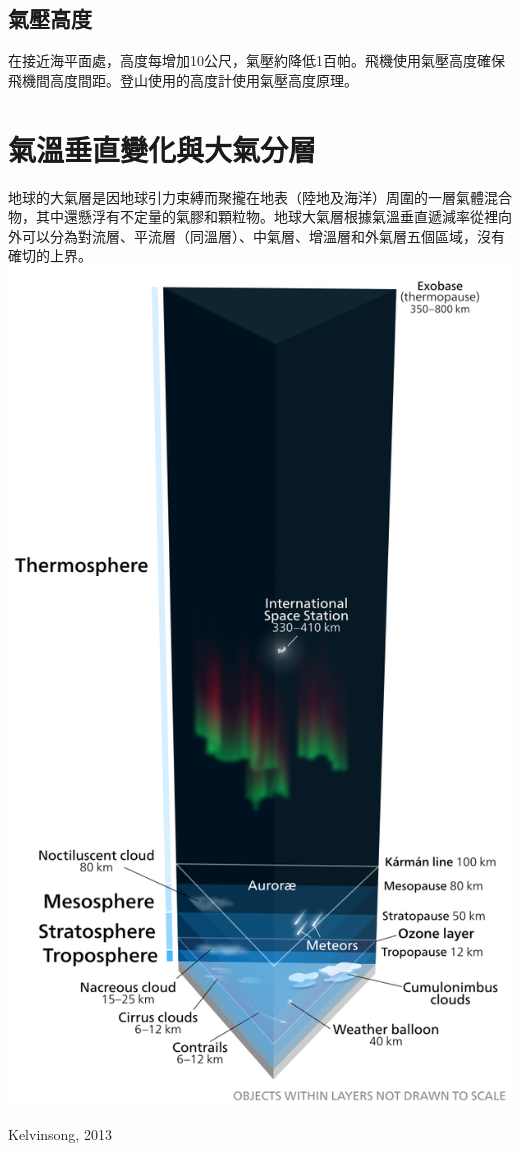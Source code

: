 \documentclass[a4paper,12pt]{report}
\begin{document}
\subsection{氣壓高度}
在接近海平面處，高度每增加10公尺，氣壓約降低1百帕。飛機使用氣壓高度確保飛機間高度間距。登山使用的高度計使用氣壓高度原理。
\section{氣溫垂直變化與大氣分層}
地球的大氣層是因地球引力束縛而聚攏在地表（陸地及海洋）周圍的一層氣體混合物，其中還懸浮有不定量的氣膠和顆粒物。地球大氣層根據氣溫垂直遞減率從裡向外可以分為對流層、平流層（同溫層）、中氣層、增溫層和外氣層五個區域，沒有確切的上界。 
\bct\bfH\ctr\includegraphics[height=0.8\textheight]{atmosphere.png}\caption{Kelvinsong, 2013}\ef\FB\ect
\end{document}
